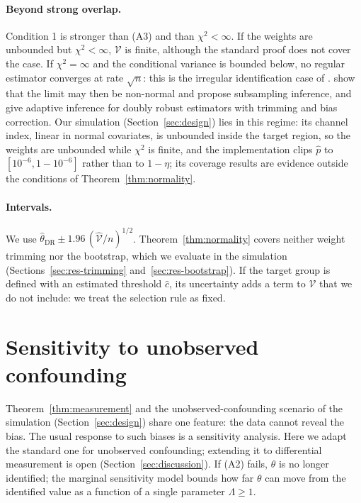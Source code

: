 \documentclass[twoside,11pt]{article}
\theoremstyle{plain}
\theoremstyle{definition}
\begin{document}
\paragraph{Beyond strong overlap.} Condition 1 is stronger than (A3) and than $\chi^2<\infty$. If the weights are unbounded but $\chi^2<\infty$, $\mathcal V$ is finite, although the standard proof does not cover the case. If $\chi^2=\infty$ and the conditional variance is bounded below, no regular estimator converges at rate $\sqrt n$: this is the irregular identification case of \citet{khan2010}. \citet{ma2020} show that the limit may then be non-normal and propose subsampling inference, and \citet{ma2023} give adaptive inference for doubly robust estimators with trimming and bias correction. Our simulation (Section~\ref{sec:design}) lies in this regime: its channel index, linear in normal covariates, is unbounded inside the target region, so the weights are unbounded while $\chi^2$ is finite, and the implementation clips $\hat p$ to $[10^{-6},1-10^{-6}]$ rather than to $1-\eta$; its coverage results are evidence outside the conditions of Theorem~\ref{thm:normality}.

\paragraph{Intervals.} We use $\hat\theta_{\mathrm{DR}}\pm1.96\,(\hat{\mathcal V}/n)^{1/2}$. Theorem~\ref{thm:normality} covers neither weight trimming nor the bootstrap, which we evaluate in the simulation (Sections~\ref{sec:res-trimming} and~\ref{sec:res-bootstrap}). If the target group is defined with an estimated threshold $\hat c$, its uncertainty adds a term to $\mathcal V$ that we do not include: we treat the selection rule as fixed.
\section{Sensitivity to unobserved confounding}\label{sec:sensitivity}

Theorem~\ref{thm:measurement} and the unobserved-confounding scenario of the simulation (Section~\ref{sec:design}) share one feature: the data cannot reveal the bias. The usual response to such biases is a sensitivity analysis. Here we adapt the standard one for unobserved confounding; extending it to differential measurement is open (Section~\ref{sec:discussion}). If (A2) fails, $\theta$ is no longer identified; the marginal sensitivity model bounds how far $\theta$ can move from the identified value as a function of a single parameter $\Lambda\ge1$.
\end{document}
